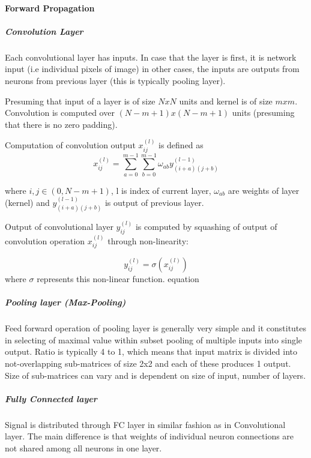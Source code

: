 \documentclass[11pt]{article}
\begin{document}
\paragraph{Forward Propagation}
\label{sec:orgb7f2217}
\subparagraph{Convolution Layer}
\label{sec:org6b96410}
Each convolutional layer has inputs. In case that the layer is first, it is network input (i.e individual pixels of image) in other cases, the inputs are outputs from neurons from previous layer (this is typically pooling layer).

Presuming that input of a layer is of size \(N x N\) units and kernel is of size \(m x m\). Convolution is computed over \((N-m+1) x (N-m+1)\) units (presuming that there is no zero padding).

Computation of convolution output \(x_{ij}^{(l)}\) is defined as
 \begin{equation}
x_{ij}^{(l)}=\sum_{a=0}^{m-1}\sum_{b=0}^{m-1}\omega_{ab}y_{(i+a)(j+b)}^{(l-1)}
 \end{equation}

where \(i, j \in (0,N-m+1)\), l is index of current layer, \(\omega_{ab}\) are weights of layer (kernel) and \(y_{(i+a)(j+b)}^{(l-1)}\) is output of previous layer.

Output of convolutional layer \(y_{ij}^{(l)}\) is computed by squashing of output of convolution operation \(x_{ij}^{(l)}\) through non-linearity:

\begin{equation}
y_{ij}^{(l)}=\sigma(x_{ij}^{(l)})
\end{equation}
where \(\sigma\) represents this non-linear function.
equation

\subparagraph{Pooling layer (Max-Pooling)}
\label{sec:orgb49cbb5}

Feed forward operation of pooling layer is generally very simple and it constitutes in selecting of maximal value within subset
pooling of multiple inputs into single output.
Ratio is typically 4 to 1, which means that input matrix is divided into not-overlapping sub-matrices of size 2x2 and each of these produces 1 output. Size of sub-matrices can vary and is dependent on size of input, number of layers.

\subparagraph{Fully Connected layer}
\label{sec:orgcf6d04e}

Signal is distributed through FC layer in similar fashion as in Convolutional layer. The main difference is that weights of individual neuron connections are not shared among all neurons in one layer.
\end{document}
